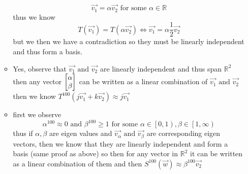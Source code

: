 \documentclass[11pt]{book}
\begin{document}
\begin{itemize}
\begin{itemize}
                \[
                \vec{v_1} = \alpha \vec{v_2} \text{ for some } \alpha \in \mathbb{R}        
                \]
                thus we know 
                \[
                T\left(\vec{v_1} \right) = T\left(\alpha \vec{v_2} \right) \Leftrightarrow \vec{v_1} = \alpha \frac{1}{2}\vec{v_2} 
                \]
                but we then we have a contradiction so they must be linearly independent and thus form a basis.
            \item Yes, observe that $\vec{v_1} \text{ and } \vec{v_2} $ are linearly independent and thus span $\mathbb{R} ^{2} $ then any vector $\begin{bmatrix} \alpha  \\ \beta  \end{bmatrix} $ can be written as a linear combination of $\vec{v_1} \text{ and } \vec{v_2} $ then we know $T^{100} \left(j\vec{v_1}  + k\vec{v_2} \right) \approx j\vec{v_1} $ 
            \item first we observe
                \[
                    \alpha ^{100} \approx 0 \text{ and } \beta ^{100} \ge 1 \text{ for some } \alpha \in \left[ 0, 1 \right), \beta \in \left[ 1, \infty  \right) 
                \]
                thus if $\alpha ,\beta $ are eigen values and $\vec{v_{\alpha } } \text{ and } \vec{v_{\beta } } $ are corresponding eigen vectors, then we know that they are linearly independent and form a basis (same proof as above) so then for any vector in $\mathbb{R} ^{2} $ it can be written as a linear combination of them and then $S^{100} \left(\vec{w} \right) \approx \beta ^{100} \vec{v_2} $ 
        \end{itemize}
\end{itemize}


\end{document}

